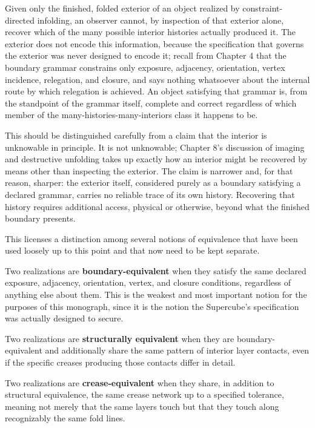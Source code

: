 \documentclass[11pt,oneside]{book}
\begin{document}
Given only the finished, folded exterior of an object realized by
constraint-directed infolding, an observer cannot, by inspection of that
exterior alone, recover which of the many possible interior histories
actually produced it. The exterior does not encode this information,
because the specification that governs the exterior was never designed
to encode it; recall from Chapter 4 that the boundary grammar constrains
only exposure, adjacency, orientation, vertex incidence, relegation, and
closure, and says nothing whatsoever about the internal route by which
relegation is achieved. An object satisfying that grammar is, from the
standpoint of the grammar itself, complete and correct regardless of
which member of the many-histories-many-interiors class it happens to
be.

This should be distinguished carefully from a claim that the interior is
unknowable in principle. It is not unknowable; Chapter 8's discussion of
imaging and destructive unfolding takes up exactly how an interior might
be recovered by means other than inspecting the exterior. The claim is
narrower and, for that reason, sharper: the exterior itself, considered
purely as a boundary satisfying a declared grammar, carries no reliable
trace of its own history. Recovering that history requires additional
access, physical or otherwise, beyond what the finished boundary
presents.

This licenses a distinction among several notions of equivalence that
have been used loosely up to this point and that now need to be kept
separate.

Two realizations are \textbf{boundary-equivalent} when they satisfy the
same declared exposure, adjacency, orientation, vertex, and closure
conditions, regardless of anything else about them. This is the weakest
and most important notion for the purposes of this monograph, since it
is the notion the Supercube's specification was actually designed to
secure.

Two realizations are \textbf{structurally equivalent} when they are
boundary-equivalent and additionally share the same pattern of interior
layer contacts, even if the specific creases producing those contacts
differ in detail.

Two realizations are \textbf{crease-equivalent} when they share, in
addition to structural equivalence, the same crease network up to a
specified tolerance, meaning not merely that the same layers touch but
that they touch along recognizably the same fold lines.
\end{document}
